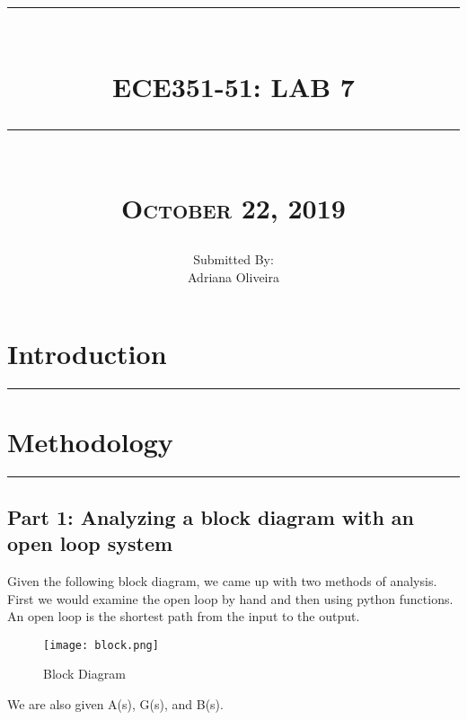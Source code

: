 \documentclass[12pt]{report}
\newcommand{\HRule}[1]{\rule{\linewidth}{#1}}
\begin{document}
\title{ 
		\\ [2.0cm]
		\HRule{0.5pt} \\
		\LARGE \textbf{\uppercase{ECE351-51: Lab 7}} 
		\HRule{2pt} \\ [0.5cm]
		\normalsize\textsc{October 22, 2019} \vspace*{5\baselineskip}}

\date{}
\author{\normalsize
		Submitted By: \\
		\normalsize Adriana Oliveira\\}

\maketitle

\newpage

\sectionfont{\scshape}
\section*{Introduction}
\hrule
\vspace{1cm}
\setlength{\parindent}{5ex}


\section*{Methodology}
\hrule
\vspace{1cm}
\setlength{\parindent}{5ex}


\vspace{-0.5cm}
\subsection*{Part 1: Analyzing a block diagram with an open loop system}
\setlength{\parindent}{5ex}
Given the following block diagram, we came up with two methods of analysis. First we would examine the open loop by hand and then using python functions. An open loop is the shortest path from the input to the output. \par

\begin{figure}[htp]
    \centering
    \texttt{[image: block.png]}
    \caption{Block Diagram}
    \label{fig:ghj}
\end{figure}

We are also given A(s), G(s), and B(s).
\end{document}
